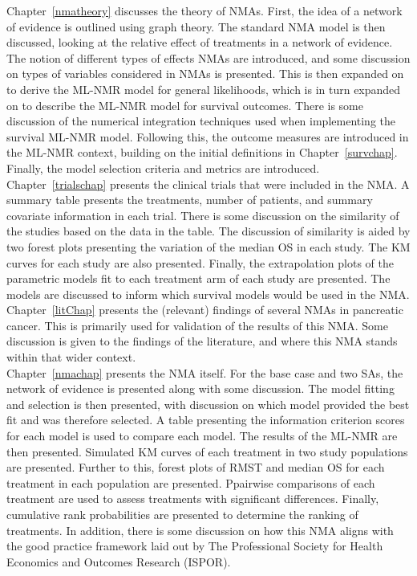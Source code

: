 Chapter~\ref{nmatheory} discusses the theory of NMAs. First, the idea of a network of evidence is outlined using graph theory. The standard NMA model is then discussed, looking at the relative effect of treatments in a network of evidence. The notion of different types of effects NMAs are introduced, and some discussion on types of variables considered in NMAs is presented. This is then expanded on to derive the ML-NMR model for general likelihoods, which is in turn expanded on to describe the ML-NMR model for survival outcomes. There is some discussion of the numerical integration techniques used when implementing the survival ML-NMR model. Following this, the outcome measures are introduced in the ML-NMR context, building on the initial definitions in Chapter~\ref{survchap}. Finally, the model selection criteria and metrics are introduced. \\

Chapter~\ref{trialschap} presents the clinical trials that were included in the NMA. A summary table presents the treatments, number of patients, and summary covariate information in each trial. There is some discussion on the similarity of the studies based on the data in the table. The discussion of similarity is aided by two forest plots presenting the variation of the median OS in each study. The KM curves for each study are also presented. Finally, the extrapolation plots of the parametric models fit to each treatment arm of each study are presented. The models are discussed to inform which survival models would be used in the NMA. \\

Chapter~\ref{litChap} presents the (relevant) findings of several NMAs in pancreatic cancer. This is primarily used for validation of the results of this NMA. Some discussion is given to the findings of the literature, and where this NMA stands within that wider context. \\

Chapter~\ref{nmachap} presents the NMA itself. For the base case and two SAs, the network of evidence is presented along with some discussion. The model fitting and selection is then presented, with discussion on which model provided the best fit and was therefore selected. A table presenting the information criterion scores for each model is used to compare each model. The results of the ML-NMR are then presented. Simulated KM curves of each treatment in two study populations are presented. Further to this, forest plots of RMST and median OS for each treatment in each population are presented. Ppairwise comparisons of each treatment are used to assess treatments with significant differences. Finally, cumulative rank probabilities are presented to determine the ranking of treatments.  
In addition, there is some discussion on how this NMA aligns with the good practice framework laid out by The Professional Society for Health Economics and Outcomes Research (ISPOR).\\


